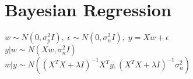 \section{Bayesian Regression}
$w\sim N(0,\sigma_p^2I),\;\epsilon \sim N(0,\sigma_n^2I),\; y=Xw+\epsilon$\\
$y\vert w \sim N(Xw,\sigma_n^2I)$\\
$w\vert y \sim N({(X^TX+\lambda I)}^{-1}X^Ty, {(X^TX+\lambda I)}^{-1}\sigma_n^2)$